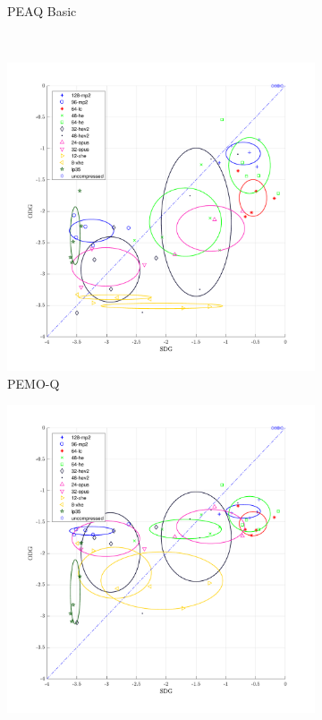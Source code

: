 \begin{figure}[h!]
\begin{subfigure}{.5\textwidth}
        \caption{PEAQ Basic}
        \label{fig:compare:basic}
    \end{subfigure}
    \\
        \begin{subfigure}{.5\textwidth}
        \centering
        \includegraphics[width=1\linewidth]{pic/comparePemoq.pdf}
        \caption{PEMO-Q}
        \label{fig:compare:pemoq}
    \end{subfigure}%
        \begin{subfigure}{.5\textwidth}
        \centering
        \includegraphics[width=1\linewidth]{pic/compareVisqol.pdf}

\end{subfigure}
\end{figure}
